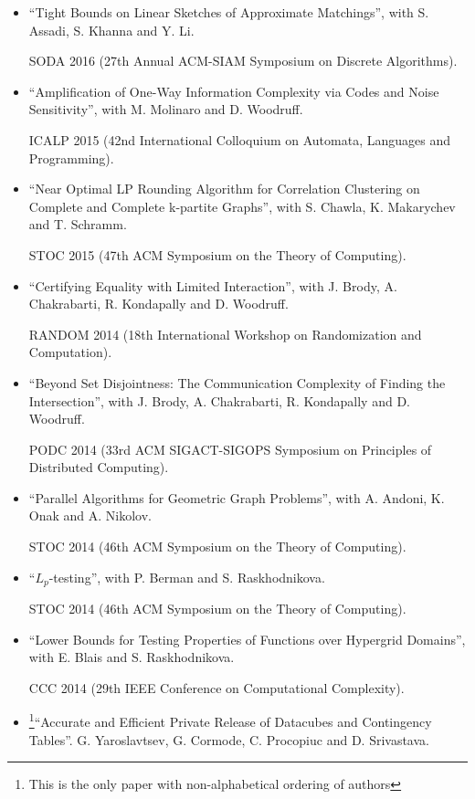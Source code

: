 \documentclass[11pt]{article}
\newenvironment{outerlist}[1][\enskip\textbullet]%
        {\begin{itemize}[#1]}{\end{itemize}%
         \vspace{-.6\baselineskip}}
\begin{document}
\begin{outerlist}

\item ``Tight Bounds on Linear Sketches of Approximate Matchings'', with S. Assadi, S. Khanna and Y. Li.

SODA 2016 (27th Annual ACM-SIAM Symposium on Discrete Algorithms).

\item ``Amplification of One-Way Information Complexity via Codes and Noise Sensitivity'', with M. Molinaro and D. Woodruff.

ICALP 2015 (42nd International Colloquium on Automata, Languages and Programming).

\item ``Near Optimal LP Rounding Algorithm for Correlation Clustering on Complete and Complete k-partite Graphs'', with S. Chawla, K. Makarychev and T. Schramm.

STOC 2015 (47th ACM Symposium on the Theory of Computing).

\item ``Certifying Equality with Limited Interaction'', with J. Brody, A. Chakrabarti, R. Kondapally and D. Woodruff.

RANDOM 2014 (18th International Workshop on Randomization and Computation).

\item ``Beyond Set Disjointness: The Communication Complexity of Finding the Intersection'', with J. Brody, A. Chakrabarti, R. Kondapally and D. Woodruff.

PODC 2014 (33rd ACM SIGACT-SIGOPS Symposium on Principles of Distributed Computing).

\item ``Parallel Algorithms for Geometric Graph Problems'', with A. Andoni, K. Onak and A. Nikolov.

STOC 2014 (46th ACM Symposium on the Theory of Computing). 

\item ``$L_p$-testing'', with P. Berman and S. Raskhodnikova.

STOC 2014 (46th ACM Symposium on the Theory of Computing). 

\item ``Lower Bounds for Testing Properties of Functions over Hypergrid Domains'', with E. Blais and S. Raskhodnikova.

CCC 2014 (29th IEEE Conference on Computational Complexity). 

\item \footnote{This is the only paper with non-alphabetical ordering of authors}``Accurate and Efficient Private Release of Datacubes and Contingency Tables''. 
G. Yaroslavtsev, G. Cormode, C. Procopiuc and D. Srivastava.


\end{outerlist}
\end{document}
